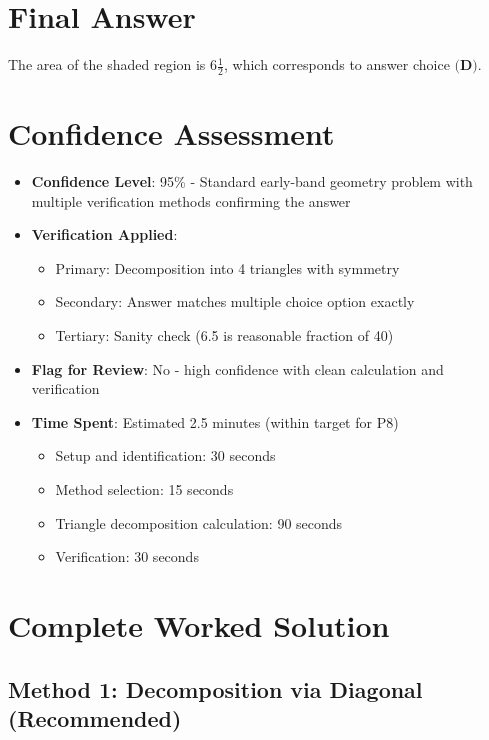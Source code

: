 \documentclass[11pt]{article}
\begin{document}
\section*{Final Answer}

The area of the shaded region is $\boxed{6\frac{1}{2}}$, which corresponds to answer choice $\boxed{\textbf{(D)}}$.

\section*{Confidence Assessment}

\begin{itemize}[leftmargin=*]
    \item \textbf{Confidence Level}: 95\% - Standard early-band geometry problem with multiple verification methods confirming the answer
    \item \textbf{Verification Applied}: 
        \begin{itemize}
            \item Primary: Decomposition into 4 triangles with symmetry
            \item Secondary: Answer matches multiple choice option exactly
            \item Tertiary: Sanity check (6.5 is reasonable fraction of 40)
        \end{itemize}
    \item \textbf{Flag for Review}: No - high confidence with clean calculation and verification
    \item \textbf{Time Spent}: Estimated 2.5 minutes (within target for P8)
        \begin{itemize}
            \item Setup and identification: 30 seconds
            \item Method selection: 15 seconds
            \item Triangle decomposition calculation: 90 seconds
            \item Verification: 30 seconds
        \end{itemize}
\end{itemize}

\section*{Complete Worked Solution}

\subsection*{Method 1: Decomposition via Diagonal (Recommended)}
\end{document}

